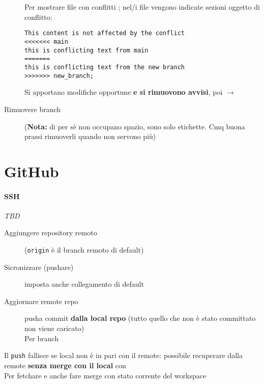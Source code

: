\documentclass[10pt, oneside]{Book}
\begin{document}
\begin{description}
\\
\\Per mostrare file con conflitti ;
nel/i file vengono indicate sezioni oggetto di conflitto:
\begin{verbatim}
This content is not affected by the conflict
<<<<<<< main
this is conflicting text from main
=======
this is conflicting text from the new branch
>>>>>>> new_branch;
\end{verbatim}
Si apportano modifiche opportune \textbf{e si rimuovono avvisi}, poi  $\rightarrow$ 
\item[Rimuovere branch]  (\textbf{Nota:} di per sè non occupano spazio, sono solo etichette. Cmq buona prassi rimuoverli quando non servono più)
\end{description}
\section{GitHub}
\paragraph{SSH} \textit{TBD}
\begin{description}
\item[Aggiungere repository remoto]  (\texttt{origin} è il branch remoto di default)
\item[Sicronizzare (pushare)]  imposta anche collegamento di default
\item[Aggiornare remote repo]  pusha commit \textbf{dalla local repo} (tutto quello che non è stato committato non viene caricato)
\\Per branch 
\end{description}
Il \texttt{push} fallisce se local non è in pari con il remote: possibile recuperare dalla remote \textbf{senza merge con il local} con 
\\ Per fetchare e anche fare merge con stato corrente del workspace
\end{document}
